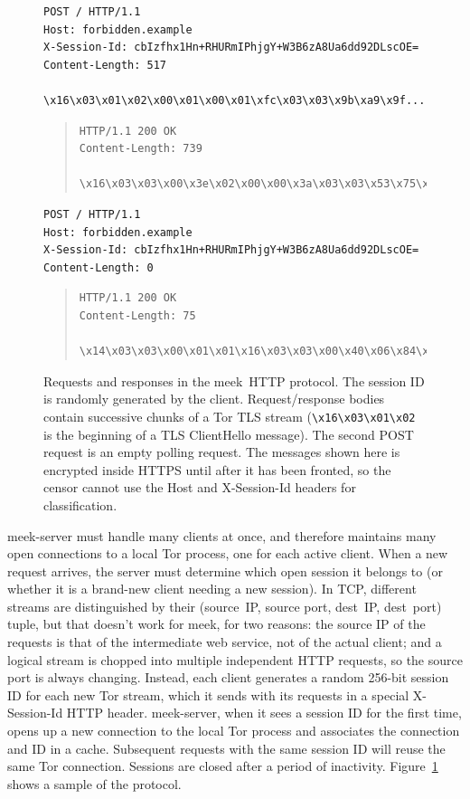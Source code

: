 \documentclass[conference]{IEEEtran}
\newcommand{\meekserver}{\mbox{meek-server}\xspace}
\newcommand{\meek}{meek\xspace}
\begin{document}
\begin{figure}
\scriptsize
\begin{verbatim}
POST / HTTP/1.1
Host: forbidden.example
X-Session-Id: cbIzfhx1Hn+RHURmIPhjgY+W3B6zA8Ua6dd92DLscOE=
Content-Length: 517

\x16\x03\x01\x02\x00\x01\x00\x01\xfc\x03\x03\x9b\xa9\x9f...
\end{verbatim}
\smallskip
\begin{quote}
\begin{verbatim}
HTTP/1.1 200 OK
Content-Length: 739

\x16\x03\x03\x00\x3e\x02\x00\x00\x3a\x03\x03\x53\x75\xa2...
\end{verbatim}
\end{quote}
\smallskip
\begin{verbatim}
POST / HTTP/1.1
Host: forbidden.example
X-Session-Id: cbIzfhx1Hn+RHURmIPhjgY+W3B6zA8Ua6dd92DLscOE=
Content-Length: 0

\end{verbatim}
\smallskip
\begin{quote}
\begin{verbatim}
HTTP/1.1 200 OK
Content-Length: 75

\x14\x03\x03\x00\x01\x01\x16\x03\x03\x00\x40\x06\x84\x25...
\end{verbatim}
\end{quote}
\caption{
Requests and responses in the \meek\ HTTP protocol.
The session ID is randomly generated by the client.
Request/response bodies contain successive chunks of a Tor TLS stream
(\texttt{\textbackslash{}x16\textbackslash{}x03\textbackslash{}x01\textbackslash{}x02}
is the beginning of a TLS ClientHello message).
The second POST request is an empty polling request.
The messages shown here is encrypted inside HTTPS until after
it has been fronted,
so the censor cannot use the
Host and \mbox{X-Session-Id} headers for classification.
}
\label{fig:protocol}
\end{figure}

\meekserver must handle many clients at once,
and therefore maintains many open connections to a local Tor process,
one for each active client.
When a new request arrives, the server must determine which
open session it belongs to
(or whether it is a brand-new client needing a new session).
In TCP, different streams are distinguished by their
(source~IP, source port, dest~IP, dest~port) tuple,
but that doesn't work for \meek, for two reasons:
the source IP of the requests is that of the intermediate web service,
not of the actual client;
and a logical stream is chopped into multiple independent HTTP requests,
so the source port is always changing.
Instead, each client generates a random 256-bit session ID for each new Tor stream,
which it sends with its requests in a special
\mbox{X-Session-Id} HTTP header.
\meekserver, when it sees a session ID for the first time,
opens up a new connection to the local Tor process
and associates the connection and ID in a cache.
Subsequent requests with the
same session ID will reuse the same Tor connection.
Sessions are closed after a period of inactivity.
Figure~\ref{fig:protocol} shows a sample of the protocol.
\end{document}

